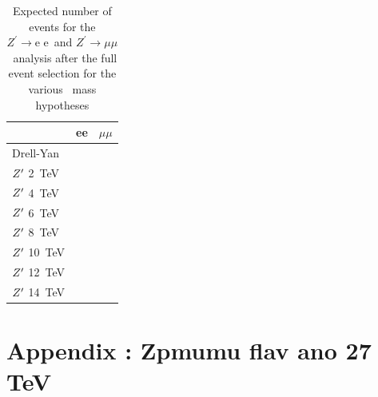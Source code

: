 \documentclass{cernrep}
\newcommand*{\Zpee}{\ensuremath{Z^{\prime}\rightarrow \text{e e}}}
\newcommand*{\Zpmumu}{\ensuremath{Z^{\prime}\rightarrow \mu\mu}}
\begin{document}
\begin{table}[!htb]
   \centering
\begin{tabular}{|l|r|r|}
  \hline
  \hline
 & ee & $\mu\mu$  \\
  \hline
  Drell-Yan &  &  \\
  \hline
  $Z^{\prime}$ 2~TeV  &   &  \\
  $Z^{\prime}$ 4~TeV  &   &  \\
  $Z^{\prime}$ 6~TeV  &   & \\
  $Z^{\prime}$ 8~TeV  &   &  \\
  $Z^{\prime}$ 10~TeV &   &  \\
  $Z^{\prime}$ 12~TeV &   & \\
  $Z^{\prime}$ 14~TeV &   & \\
  \hline
  \hline
\end{tabular}
  \caption{Expected number of events for the \Zpee\ and \Zpmumu\ analysis after the full event selection for the various \Zp\ mass hypotheses}
  \label{tab:leptonicresonances27:yieldsll}
\end{table}

\clearpage
\newpage

\section{Appendix : Zpmumu flav ano 27 TeV}
\label{appendix:zpmumufalvano27}
\end{document}
